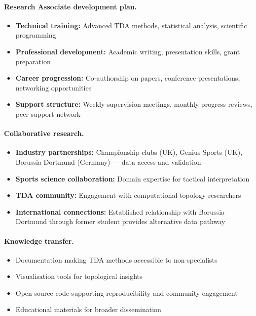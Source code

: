 \paragraph{Research Associate development plan.}
\begin{itemize}
  \item \textbf{Technical training:} Advanced TDA methods, statistical analysis, scientific programming
  \item \textbf{Professional development:} Academic writing, presentation skills, grant preparation
  \item \textbf{Career progression:} Co-authorship on papers, conference presentations, networking opportunities
  \item \textbf{Support structure:} Weekly supervision meetings, monthly progress reviews, peer support network
\end{itemize}

\paragraph{Collaborative research.}
\begin{itemize}
  \item \textbf{Industry partnerships:} Championship clubs (UK), Genius Sports (UK), Borussia Dortmund (Germany) --- data access and validation
  \item \textbf{Sports science collaboration:} Domain expertise for tactical interpretation
  \item \textbf{TDA community:} Engagement with computational topology researchers
  \item \textbf{International connections:} Established relationship with Borussia Dortmund through former student provides alternative data pathway
\end{itemize}

\paragraph{Knowledge transfer.}
\begin{itemize}
  \item Documentation making TDA methods accessible to non-specialists
  \item Visualisation tools for topological insights
  \item Open-source code supporting reproducibility and community engagement
  \item Educational materials for broader dissemination
\end{itemize}

